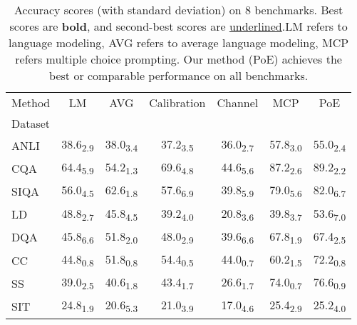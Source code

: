 \begin{table}[h]
\centering
\caption{Accuracy scores (with standard deviation) on 8 benchmarks. Best scores are \textbf{bold}, and second-best scores are \underline{underlined}.LM refers to language modeling, AVG refers to average language modeling, MCP refers multiple choice prompting. Our method (PoE) achieves the best or comparable performance on all benchmarks.}
\label{tab:main_exp}
\begin{tabular}{l|c|c|c|c|c|c}
Method & LM & AVG & Calibration & Channel & MCP & PoE \\
Dataset &  &  &  &  &  &  \\
ANLI & 38.6\textsubscript{2.9} & 38.0\textsubscript{3.4} & 37.2\textsubscript{3.5} & 36.0\textsubscript{2.7} & 57.8\textsubscript{3.0} & 55.0\textsubscript{2.4} \\
CQA & 64.4\textsubscript{5.9} & 54.2\textsubscript{1.3} & 69.6\textsubscript{4.8} & 44.6\textsubscript{5.6} & 87.2\textsubscript{2.6} & 89.2\textsubscript{2.2} \\
SIQA & 56.0\textsubscript{4.5} & 62.6\textsubscript{1.8} & 57.6\textsubscript{6.9} & 39.8\textsubscript{5.9} & 79.0\textsubscript{5.6} & 82.0\textsubscript{6.7} \\
LD & 48.8\textsubscript{2.7} & 45.8\textsubscript{4.5} & 39.2\textsubscript{4.0} & 20.8\textsubscript{3.6} & 39.8\textsubscript{3.7} & 53.6\textsubscript{7.0} \\
DQA & 45.8\textsubscript{6.6} & 51.8\textsubscript{2.0} & 48.0\textsubscript{2.9} & 39.6\textsubscript{6.6} & 67.8\textsubscript{1.9} & 67.4\textsubscript{2.5} \\
CC & 44.8\textsubscript{0.8} & 51.8\textsubscript{0.8} & 54.4\textsubscript{0.5} & 44.0\textsubscript{0.7} & 60.2\textsubscript{1.5} & 72.2\textsubscript{0.8} \\
SS & 39.0\textsubscript{2.5} & 40.6\textsubscript{1.8} & 43.4\textsubscript{1.7} & 26.6\textsubscript{1.7} & 74.0\textsubscript{0.7} & 76.6\textsubscript{0.9} \\
SIT & 24.8\textsubscript{1.9} & 20.6\textsubscript{5.3} & 21.0\textsubscript{3.9} & 17.0\textsubscript{4.6} & 25.4\textsubscript{2.9} & 25.2\textsubscript{4.0} \\
\end{tabular}
\end{table}
